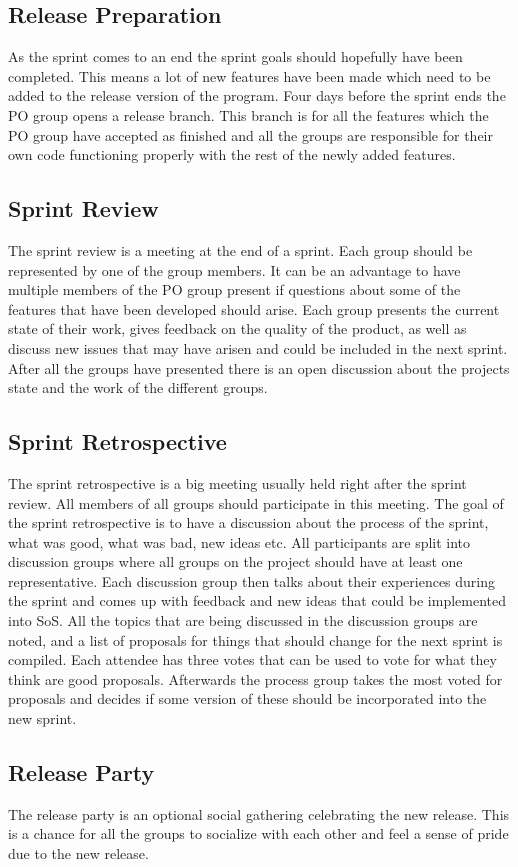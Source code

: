 \subsection{Release Preparation}
As the sprint comes to an end the sprint goals should hopefully have been completed.
This means a lot of new features have been made which need to be added to the release version of the program.
Four days before the sprint ends the PO group opens a release branch.
This branch is for all the features which the PO group have accepted as finished and all the groups are responsible for their own code functioning properly with the rest of the newly added features.


\subsection{Sprint Review} \label{subsec:SoS-sprint-review}
The sprint review is a meeting at the end of a sprint. 
Each group should be represented by one of the group members. 
It can be an advantage to have multiple members of the PO group present if questions about some of the features that have been developed should arise.
Each group presents the current state of their work, gives feedback on the quality of the product, as well as discuss new issues that may have arisen and could be included in the next sprint.
After all the groups have presented there is an open discussion about the projects state and the work of the different groups.

\subsection{Sprint Retrospective}
The sprint retrospective is a big meeting usually held right after the sprint review.
All members of all groups should participate in this meeting.
The goal of the sprint retrospective is to have a discussion about the process of the sprint, what was good, what was bad, new ideas etc.
All participants are split into discussion groups where all groups on the project should have at least one representative.
\newline
\newline
Each discussion group then talks about their experiences during the sprint and comes up with feedback and new ideas that could be implemented into SoS.
All the topics that are being discussed in the discussion groups are noted, and a list of proposals for things that should change for the next sprint is compiled.
Each attendee has three votes that can be used to vote for what they think are good proposals.
Afterwards the process group takes the most voted for proposals and decides if some version of these should be incorporated into the new sprint.

\subsection{Release Party}
The release party is an optional social gathering celebrating the new release. 
This is a chance for all the groups to socialize with each other and feel a sense of pride due to the new release.

